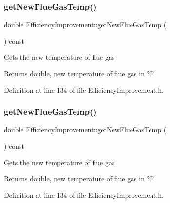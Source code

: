 \subsubsection{\texorpdfstring{get\+New\+Flue\+Gas\+Temp()}{getNewFlueGasTemp()}\hspace{0.1cm}{\footnotesize\ttfamily [2/3]}}
{\footnotesize\ttfamily double Efficiency\+Improvement\+::get\+New\+Flue\+Gas\+Temp (\begin{DoxyParamCaption}{ }\end{DoxyParamCaption}) const\hspace{0.3cm}{\ttfamily [inline]}}

Gets the new temperature of flue gas

\begin{DoxyReturn}{Returns}
double, new temperature of flue gas in °F 
\end{DoxyReturn}


Definition at line 134 of file Efficiency\+Improvement.\+h.

\mbox{\label{class_efficiency_improvement_a4de84ef27e3b4c518319fea77d039845}} 
\subsubsection{\texorpdfstring{get\+New\+Flue\+Gas\+Temp()}{getNewFlueGasTemp()}\hspace{0.1cm}{\footnotesize\ttfamily [3/3]}}
{\footnotesize\ttfamily double Efficiency\+Improvement\+::get\+New\+Flue\+Gas\+Temp (\begin{DoxyParamCaption}{ }\end{DoxyParamCaption}) const\hspace{0.3cm}{\ttfamily [inline]}}

Gets the new temperature of flue gas

\begin{DoxyReturn}{Returns}
double, new temperature of flue gas in °F 
\end{DoxyReturn}


Definition at line 134 of file Efficiency\+Improvement.\+h.

\mbox{\label{class_efficiency_improvement_a1b85007b7b046b998443f5eb267822f9}} 
